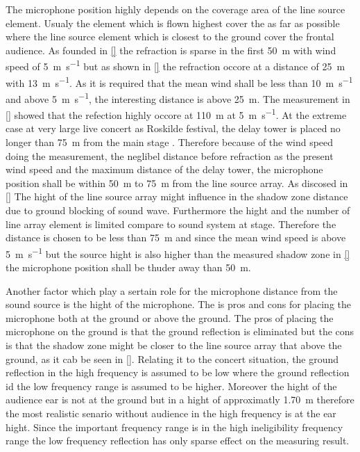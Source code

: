 The microphone position highly depends on the coverage area of the line source element. Usualy the element which is flown highest cover the as far as possible where the line source element which is closest to the ground cover the frontal audience. As founded in \autoref{} the refraction is sparse in the first \SI{50}{\meter} with wind speed of \SI{5}{\meter\per\second} but as shown in \autoref{} the refraction occore at a distance of \SI{25}{\meter} with \SI{13}{\meter\per\second}. As it is required that the mean wind shall be less than \SI{10}{\meter\per\second} and above \SI{5}{\meter\per\second}, the interesting distance is above \SI{25}{\meter}. The measurement in \autoref{} showed that the refection highly occore at \SI{110}{\meter} at \SI{5}{\meter\per\second}. At the extreme case at very large live concert as Roskilde festival, the delay tower is placed no longer than \SI{75}{\meter} from the main stage \citep{}. Therefore because of the wind speed doing the measurement, the neglibel distance before refraction as the present wind speed and the maximum distance of the delay tower, the microphone position shall be within \SI{50}{\meter} to \SI{75}{\meter} from the line source array. As discosed in \autoref{} The hight of the line source array might influence in the shadow zone distance due to ground blocking of sound wave. Furthermore the hight and the number of line array element is limited compare to sound system at stage. Therefore the distance is chosen to be less than \SI{75}{\meter} and since the mean wind speed is above \SI{5}{\meter\per\second} but the source hight is also higher than the measured shadow zone in \autoref{} the microphone position shall be thuder away than \SI{50}{\meter}. 

Another factor which play a sertain role for the microphone distance from the sound source is the hight of the microphone. The is pros and cons for placing the microphone both at the ground or above the ground. The pros of placing the microphone on the ground is that the ground reflection is eliminated but the cons is that the shadow zone might be closer to the line source array that above the ground, as it cab be seen in \autoref{}. Relating it to the concert situation, the ground reflection in the high frequency is assumed to be low where the ground reflection id the low frequency range is assumed to be higher. Moreover the hight of the audience ear is not at the ground but in a hight of approximatly \SI{1.70}{\meter} therefore the most realistic senario without audience in the high frequency is at the ear hight. Since the important frequency range is in the high ineligibility frequency range the low frequency reflection has only sparse effect on the measuring result. 


